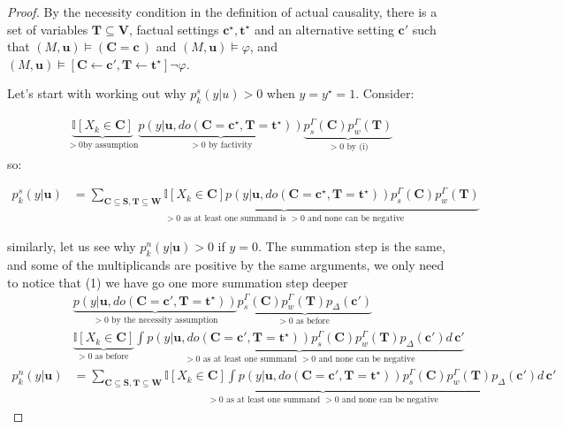 \documentclass[anon,12pt]{clear2025} %
\begin{document}
\begin{proof} By the necessity condition in the definition of actual causality, there is a set of variables \(\mathbf{T} \subseteq \mathbf{V}\), factual settings $\mathbf{c^\star, t^\star}$  and an alternative setting \(\mathbf{c'}\) such that \((M, \mathbf{u}) \vDash (\mathbf{C} = \mathbf{c}\,)\) and \((M, \mathbf{u}) \vDash \varphi\), and   $(M, \mathbf{u}) \vDash [\mathbf{C} \leftarrow \mathbf{c'}, \mathbf{T} \leftarrow \mathbf{t^\star}] \neg \varphi$.

Let's start with working out why $p^s_k(y\vert u)>0$ when $y=y^\star =1$. Consider:

\begin{align*}
\underbrace{\mathbb{I}[X_k \in \mathbf{C}]}_{>0 \text{by assumption}} \underbrace{p (y \vert \mathbf{u}, do(\mathbf{C} = \mathbf{c^\star}, \mathbf{T} = \mathbf{t^\star}))}_{>0 \text{ by factivity}} \underbrace{p^\Gamma_s(\mathbf{C}) p^\Gamma_w(\mathbf{T})}_{>0 \text{ by (i)}}
\end{align*}
\noindent so:

\begin{align*}
{p}^s_k(y \vert \mathbf{u})    &= \underbrace{\sum_{\mathbf{C} \subseteq \mathbf{S}, \mathbf{T}\subseteq \mathbf{W}} \mathbb{I}[X_k \in \mathbf{C}]
p (y \vert \mathbf{u}, do(\mathbf{C} = \mathbf{c^\star}, \mathbf{T} = \mathbf{t^\star})) p^\Gamma_s(\mathbf{C}) p^\Gamma_w(\mathbf{T})}_{>0 \text{ as at least one summand is $>0$ and none can be negative}}
\end{align*}



similarly, let us see why $p^n_k(y\vert \mathbf{u}) >0$ if $y = 0$. The summation step is the same, and some of the multiplicands are positive by the same arguments, we only need to notice that (1) we have go one more summation step deeper
\begin{align*} 
&\underbrace{p(y \vert \mathbf{u}, do(\mathbf{C} = \mathbf{c'}, \mathbf{T} = \mathbf{t^\star}))}_{> 0 \text{ by the necessity assumption}}
\underbrace{p^\Gamma_s(\mathbf{C}) p^\Gamma_w(\mathbf{T}) p_\Delta(\mathbf{c}')}_{>0 \text{ as before }} \\ &
\underbrace{\mathbb{I}[X_k \in \mathbf{C}]}_{>0 \text{ as before }}
\underbrace{\int 
p(y \vert \mathbf{u}, do(\mathbf{C} = \mathbf{c'}, \mathbf{T} = \mathbf{t^\star}))
p^\Gamma_s(\mathbf{C}) p^\Gamma_w(\mathbf{T}) p_\Delta(\mathbf{c}') d\, \mathbf{c}'}_{>0 \text { as at least one summand $>0$ and none can be negative}} \\
{p}^n_k(y \vert \mathbf{u})   & = \underbrace{\sum_{\mathbf{C} \subseteq \mathbf{S}, \mathbf{T}\subseteq \mathbf{W}} \mathbb{I}[X_k \in \mathbf{C}]
\int 
p(y \vert \mathbf{u}, do(\mathbf{C} = \mathbf{c'}, \mathbf{T} = \mathbf{t^\star}))
p^\Gamma_s(\mathbf{C}) p^\Gamma_w(\mathbf{T}) p_\Delta(\mathbf{c}') d\, \mathbf{c}'}_{>0 \text{ as at least one summand $>0$ and none can be negative}}
\end{align*}


\end{proof}
\end{document}
